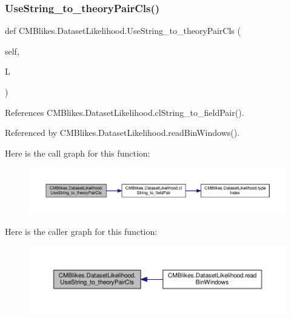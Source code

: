 \subsubsection{\texorpdfstring{Use\+String\+\_\+to\+\_\+theory\+Pair\+Cls()}{UseString\_to\_theoryPairCls()}}
{\footnotesize\ttfamily def C\+M\+Blikes.\+Dataset\+Likelihood.\+Use\+String\+\_\+to\+\_\+theory\+Pair\+Cls (\begin{DoxyParamCaption}\item[{}]{self,  }\item[{}]{L }\end{DoxyParamCaption})}



References C\+M\+Blikes.\+Dataset\+Likelihood.\+cl\+String\+\_\+to\+\_\+field\+Pair().



Referenced by C\+M\+Blikes.\+Dataset\+Likelihood.\+read\+Bin\+Windows().

Here is the call graph for this function\+:
\nopagebreak
\begin{figure}[H]
\begin{center}
\leavevmode
\includegraphics[width=350pt]{classCMBlikes_1_1DatasetLikelihood_a041f75367c5d576ee721138a8c979152_cgraph}
\end{center}
\end{figure}
Here is the caller graph for this function\+:
\nopagebreak
\begin{figure}[H]
\begin{center}
\leavevmode
\includegraphics[width=350pt]{classCMBlikes_1_1DatasetLikelihood_a041f75367c5d576ee721138a8c979152_icgraph}
\end{center}
\end{figure}
\mbox{\label{classCMBlikes_1_1DatasetLikelihood_a4947f366e34f12e16f502b68dea4632f}} 

